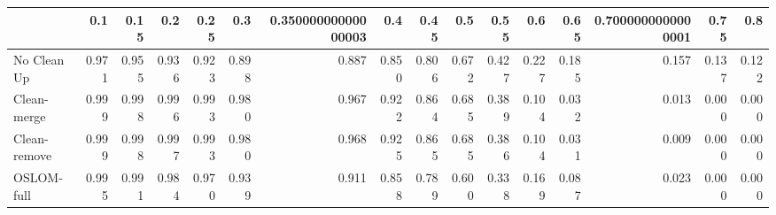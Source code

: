\begin{tabular}{lrrrrrrrrrrrrrrr}
\toprule
{} &   0.1 &  0.15 &   0.2 &  0.25 &   0.3 & 0.35000000000000003 &   0.4 &  0.45 &   0.5 &  0.55 &   0.6 &  0.65 & 0.7000000000000001 &  0.75 &   0.8 \\
\midrule
No Clean Up  & 0.971 & 0.955 & 0.936 & 0.923 & 0.898 &               0.887 & 0.850 & 0.806 & 0.672 & 0.427 & 0.227 & 0.185 &              0.157 & 0.137 & 0.122 \\
Clean-merge  & 0.999 & 0.998 & 0.996 & 0.993 & 0.980 &               0.967 & 0.922 & 0.864 & 0.685 & 0.389 & 0.104 & 0.032 &              0.013 & 0.000 & 0.000 \\
Clean-remove & 0.999 & 0.998 & 0.997 & 0.993 & 0.980 &               0.968 & 0.925 & 0.865 & 0.685 & 0.386 & 0.104 & 0.031 &              0.009 & 0.000 & 0.000 \\
OSLOM-full   & 0.995 & 0.991 & 0.984 & 0.970 & 0.939 &               0.911 & 0.858 & 0.789 & 0.600 & 0.338 & 0.169 & 0.087 &              0.023 & 0.000 & 0.000 \\
\bottomrule
\end{tabular}
